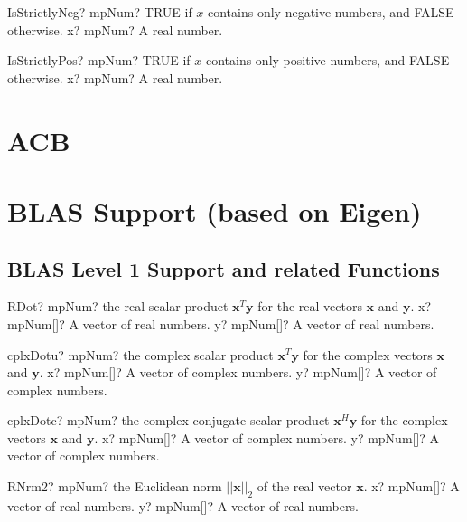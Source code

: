 \documentclass[12pt,a4paper,openany]{book}
\begin{document}
\begin{mpFunctionsExtract}
\mpFunctionOne
{IsStrictlyNeg? mpNum? TRUE if $x$ contains only negative numbers, and FALSE otherwise.}
{x? mpNum? A real number.}
\end{mpFunctionsExtract}

\begin{mpFunctionsExtract}
\mpFunctionOne
{IsStrictlyPos? mpNum? TRUE if $x$ contains only positive numbers, and FALSE otherwise.}
{x? mpNum? A real number.}
\end{mpFunctionsExtract}

\chapter{ACB}

\chapter{BLAS Support (based on Eigen)}

\section{BLAS Level 1 Support and related Functions}

\begin{mpFunctionsExtract}
\mpFunctionTwo
{RDot? mpNum? the real scalar product $\boldsymbol{x}^T \boldsymbol{y}$ for the real vectors $\boldsymbol{x}$ and $\boldsymbol{y}$.}
{x? mpNum[]? A vector of real numbers.}
{y? mpNum[]? A vector of real numbers.}
\end{mpFunctionsExtract}

\begin{mpFunctionsExtract}
\mpFunctionTwo
{cplxDotu? mpNum? the complex  scalar product $\boldsymbol{x}^T \boldsymbol{y}$ for the complex  vectors $\boldsymbol{x}$ and $\boldsymbol{y}$.}
{x? mpNum[]? A vector of complex numbers.}
{y? mpNum[]? A vector of complex numbers.}
\end{mpFunctionsExtract}

\begin{mpFunctionsExtract}
\mpFunctionTwo
{cplxDotc? mpNum? the complex conjugate scalar product $\boldsymbol{x}^H \boldsymbol{y}$ for the complex  vectors $\boldsymbol{x}$ and $\boldsymbol{y}$.}
{x? mpNum[]? A vector of complex numbers.}
{y? mpNum[]? A vector of complex numbers.}
\end{mpFunctionsExtract}

\begin{mpFunctionsExtract}
\mpFunctionTwo
{RNrm2? mpNum? the Euclidean norm $||\boldsymbol{x}||_2$ of the real vector $\boldsymbol{x}$.}
{x? mpNum[]? A vector of real numbers.}
{y? mpNum[]? A vector of real numbers.}
\end{mpFunctionsExtract}
\end{document}
